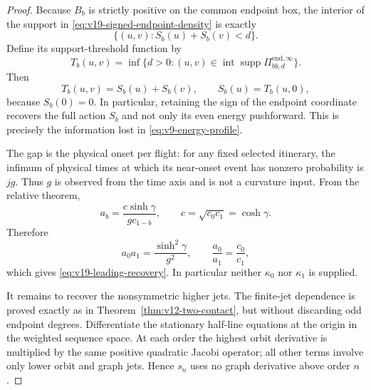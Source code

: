 \begin{proof}
Because $B_b$ is strictly positive on the common endpoint box, the interior
of the support in \eqref{eq:v19-signed-endpoint-density} is exactly
\[
 \{(u,v):S_b(u)+S_b(v)<d\}.
\]
Define its support-threshold function by
\[
 T_b(u,v)=\inf\{d>0:(u,v)\in
       \operatorname{int}\operatorname{supp}
       \Pi^{\mathrm{end},\infty}_{bb,d}\}.
\]
Then
\begin{equation}\label{eq:v19-support-threshold}
 T_b(u,v)=S_b(u)+S_b(v),\qquad S_b(u)=T_b(u,0),
\end{equation}
because $S_b(0)=0$.  In particular, retaining the sign of the endpoint
coordinate recovers the full action $S_b$ and not only its even energy
pushforward.  This is precisely the information lost in
\eqref{eq:v9-energy-profile}.

The gap is the physical onset per flight: for any fixed selected itinerary,
the infimum of physical times at which its near-onset event has nonzero
probability is $jg$.  Thus $g$ is observed from the time axis and is not a
curvature input.  From the relative theorem,
\[
 a_b=\frac{c\sinh\gamma}{g c_{1-b}},
 \qquad c=\sqrt{c_0c_1}=\cosh\gamma.
\]
Therefore
\[
 a_0a_1=\frac{\sinh^2\gamma}{g^2},
 \qquad \frac{a_0}{a_1}=\frac{c_0}{c_1},
\]
which gives \eqref{eq:v19-leading-recovery}.  In particular neither
$\kappa_0$ nor $\kappa_1$ is supplied.

It remains to recover the nonsymmetric higher jets.  The finite-jet
dependence is proved exactly as in Theorem~\ref{thm:v12-two-contact}, but
without discarding odd endpoint degrees.  Differentiate the stationary
half-line equations at the origin in the weighted sequence space.  At each
order the highest orbit derivative is multiplied by the same positive
quadratic Jacobi operator; all other terms involve only lower orbit and
graph jets.  Hence $s_n$ uses no graph derivative above order $n$.


\end{proof}
